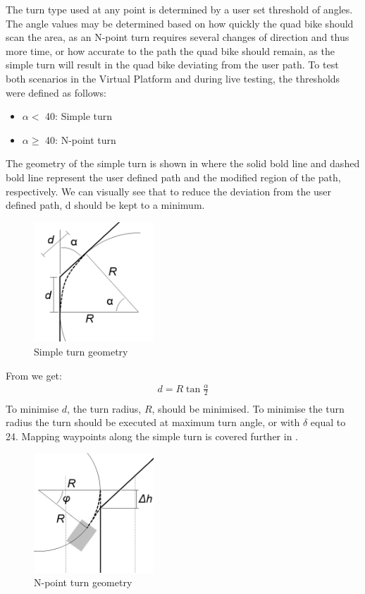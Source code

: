 \documentclass[main.tex]{subfiles}
\begin{document}
The turn type used at any point is determined by a user set threshold of angles. The angle values may be determined based on how quickly the quad bike should scan the area, as an N-point turn requires several changes of direction and thus more time, or how accurate to the path the quad bike should remain, as the simple turn will result in the quad bike deviating from the user path. To test both scenarios in the Virtual Platform and during live testing, the thresholds were defined as follows:
\begin{itemize}
\item $\alpha <$ 40\degree: Simple turn
\item $\alpha \geqslant$ 40\degree: N-point turn
\end{itemize}

The geometry of the simple turn is shown in  where the solid bold line and dashed bold line represent the user defined path and the modified region of the path, respectively. We can visually see that to reduce the deviation from the user defined path, d should be kept to a minimum.
\begin{figure}[ht]
\includegraphics[width=0.4\textwidth]{4-DetailedDesign/simpleTurnGeometry.png}
\centering
\caption{Simple turn geometry} 
\end{figure} 
From  we get:
\begin{align*}
d = R \tan{\frac{\alpha}{2}}\\
\end{align*}
To minimise $d$, the turn radius, $R$, should be minimised. To minimise the turn radius the turn should be executed at maximum turn angle, or with $\delta$ equal to 24\degree. Mapping waypoints along the simple turn is covered further in .

\begin{figure}[ht]
\includegraphics[width=0.4\textwidth]{4-DetailedDesign/nPointTurnGeometry.png}
\centering
\caption{N-point turn geometry} 
\end{figure} 
\end{document}
